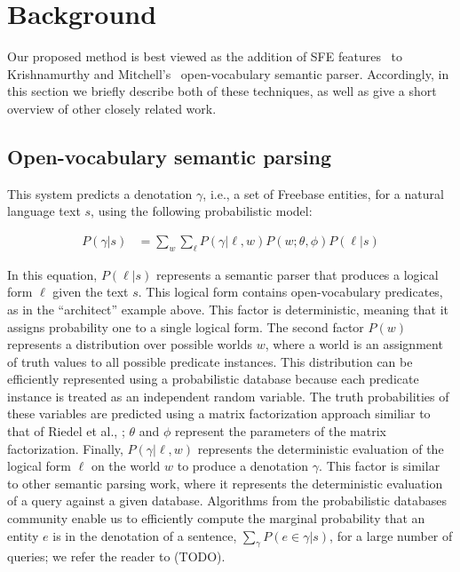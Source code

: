 \documentclass[11pt]{article}
\begin{document}
\section{Background}
\label{sec:background}

Our proposed method is best viewed as the addition of SFE
features~\cite{gardner-2015-sfe} to Krishnamurthy and
Mitchell's~
open-vocabulary semantic parser.  Accordingly, in this section we briefly
describe both of these techniques, as well as give a short overview of other
closely related work.

\subsection{Open-vocabulary semantic parsing}
\label{sec:jayant-semparse}


This system predicts a denotation $\gamma$, i.e., a set of Freebase
entities, for a natural language text $s$, using the following
probabilistic model:

\begin{align*}
P(\gamma | s) & = \sum_w \sum_\ell P(\gamma | \ell, w) P(w ; \theta, \phi) P(\ell | s)
\end{align*}

In this equation, $P(\ell | s)$ represents a semantic parser that
produces a logical form $\ell$ given the text $s$. This logical form
contains open-vocabulary predicates, as in the ``architect'' example
above. This factor is deterministic, meaning that it assigns
probability one to a single logical form. The second factor $P(w)$
represents a distribution over possible worlds $w$, where a world is
an assignment of truth values to all possible predicate
instances. This distribution can be efficiently represented using a
probabilistic database because each predicate instance is treated as
an independent random variable. The truth probabilities of these
variables are predicted using a matrix factorization approach similiar
to that of Riedel et al., ;
$\theta$ and $\phi$ represent the parameters of the matrix
factorization. Finally, $P(\gamma | \ell, w)$ represents the
deterministic evaluation of the logical form $\ell$ on the world $w$
to produce a denotation $\gamma$. This factor is similar to other
semantic parsing work, where it represents the deterministic
evaluation of a query against a given database. Algorithms from the
probabilistic databases community enable us to efficiently compute the
marginal probability that an entity $e$ is in the denotation of a
sentence, $\sum_\gamma P(e \in \gamma | s)$, for a large number of
queries; we refer the reader to (TODO).
\end{document}
